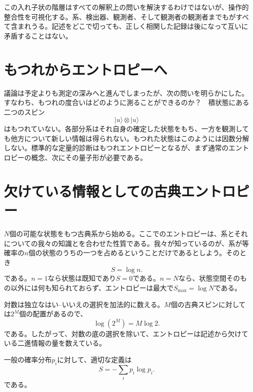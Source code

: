 この入れ子状の階層はすべての解釈上の問いを解決するわけではないが、操作的整合性を可視化する。系、検出器、観測者、そして観測者の観測者までもがすべて含まれうる。記述をどこで切っても、正しく相関した記録は後になって互いに矛盾することはない。

\section{もつれからエントロピーへ}

議論は予定よりも測定の深みへと進んでしまったが、次の問いを明らかにした。すなわち、もつれの度合いはどのように測ることができるのか？　積状態にある二つのスピン
\begin{equation}
|u\rangle\otimes|u\rangle
\end{equation}
はもつれていない。各部分系はそれ自身の確定した状態をもち、一方を観測しても他方について新しい情報は得られない。もつれた状態はこのようには因数分解しない。標準的な定量的診断はもつれエントロピーとなるが、まず通常のエントロピーの概念、次にその量子形が必要である。

\section{欠けている情報としての古典エントロピー}

\(N\)個の可能な状態をもつ古典系から始める。ここでのエントロピーは、系とそれについての我々の知識とを合わせた性質である。我々が知っているのが、系が等確率の\(n\)個の状態のうちの一つを占めるということだけであるとしよう。そのとき
\begin{equation}
S=\log n.
\end{equation}
である。\(n=1\)なら状態は既知であり\(S=0\)である。\(n=N\)なら、状態空間そのもの以外には何も知られておらず、エントロピーは最大で\(S_{\max}=\log N\)である。

対数は独立なはい--いいえの選択を加法的に数える。\(M\)個の古典スピンに対しては\(2^M\)個の配置があるので、
\begin{equation}
\log(2^M)=M\log 2.
\end{equation}
である。したがって、対数の底の選択を除いて、エントロピーは記述から欠けている二進情報の量を数えている。

一般の確率分布\(p_i\)に対して、適切な定義は
\begin{equation}
S=-\sum_i p_i\log p_i.
\end{equation}
である。

\begin{classroomqa}
\end{classroomqa}

